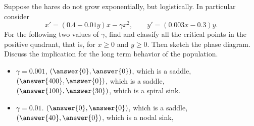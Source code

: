 \documentclass{ximera}
\begin{document}
\begin{exercise}
    Suppose the hares do not grow exponentially, but logistically.  In particular consider
    \begin{equation*}
        x' = (0.4-0.01y)x - \gamma x^2, \qquad y' = (0.003x-0.3)y .
    \end{equation*}
    For the following two values of $\gamma$, find and classify all the critical points in the positive quadrant, that is, for $x \geq 0$ and $y \geq 0$.  Then sketch the phase diagram.  Discuss the implication for the long term behavior of the population.
    \begin{itemize}
        \item $\gamma=0.001$, 
            $\left(\answer{0}, \answer{0}\right)$, which is a saddle,           \\
            $\left(\answer{400}, \answer{0}\right)$, which is a saddle,         \\
            $\left(\answer{100}, \answer{30}\right)$, which is a spiral sink.   \\
        \item $\gamma=0.01$.
            $\left(\answer{0}, \answer{0}\right)$, which is a saddle,           \\
            $\left(\answer{40}, \answer{0}\right)$, which is a nodal sink,      \\
    \end{itemize}
\end{exercise}
\end{document}
